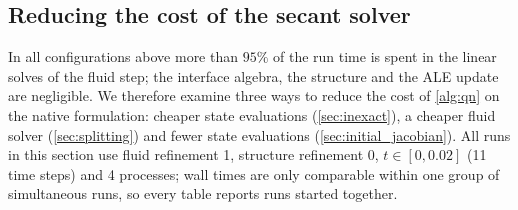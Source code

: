 \documentclass[11pt,a4paper]{article}
\theoremstyle{definition}
\theoremstyle{remark}
\begin{document}
\begin{table}[ht]\centering
\caption{Native formulation, refinement 0, average per time step over four steps (tolerance
$\|m\|\le10^{-8}$); one state evaluation = structure Newton solve, ALE update and fluid step;
$S$, $S^*$ = one linearised structure solve and one linear fluid solve each. Times: five steps,
refinement 0 and 1 (structure refinement 0), four simultaneous runs with 4 processes.}
\label{tab:native_methods}
\end{table}

\subsection{Reducing the cost of the secant solver}\label{sec:speedup}

In all configurations above more than $95\%$ of the run time is spent in the linear solves of the
fluid step; the interface algebra, the structure and the ALE update are negligible. We therefore
examine three ways to reduce the cost of \cref{alg:qn} on the native formulation: cheaper state
evaluations (\cref{sec:inexact}), a cheaper fluid solver (\cref{sec:splitting}) and fewer state
evaluations (\cref{sec:initial_jacobian}). All runs in this section use fluid refinement 1,
structure refinement 0, $t\in[0,0.02]$ (11 time steps) and 4 processes; wall times are only
comparable within one group of simultaneous runs, so every table reports runs started together.
\end{document}
